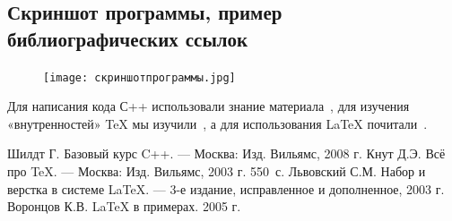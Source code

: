\documentclass[12pt,a4paper]{scrartcl}
\begin{document}
\subsection{Скриншот программы, пример библиографических ссылок}
\label{sec:picexample}
\begin{figure}[h]
	\centering
	\texttt{[image: скриншотпрограммы.jpg]}
\end{figure}
Для написания кода С++ использовали знание материала~\cite {Shildt-2008}, для изучения «внутренностей» \TeX{} мы 
изучили~\cite{Knuth-2003}, а для использования \LaTeX{}
почитали~\cite{Lvovsky-2003, Voroncov-2005}.

\begin{thebibliography}{9}
Шилдт Г. Базовый курс C++. \newblock --- Москва: Изд. Вильямс, 2008 г.  
Кнут Д.Э. Всё про \TeX. \newblock --- Москва: Изд. Вильямс, 2003 г. 550~с.
Львовский С.М. Набор и верстка в системе \LaTeX{}. \newblock --- 3-е издание, исправленное и дополненное, 2003 г.
Воронцов К.В. \LaTeX{} в примерах. 2005 г.
\end{thebibliography}
\end{document}
